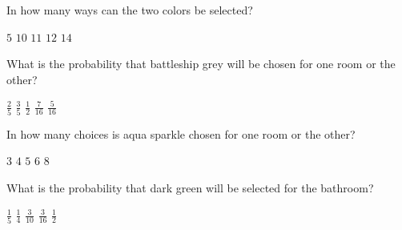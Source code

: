 \documentclass[answers,12pt]{exam}
\begin{document}
\begin{questions}

\question\label{FirstColor}
In how many ways can the two colors be selected?\\
\begin{oneparchoices}
\choice $5$ %
\correctchoice $10$
\choice $11$ %
\choice $12$ %
\choice $14$ %
\end{oneparchoices}

\question
What is the probability that battleship grey will be chosen
for one room or the other?\\
\begin{oneparchoices}
\choice $\frac{2}{5}$ %
\correctchoice $\frac{3}{5}$
\choice $\frac{1}{2}$ %
\choice $\frac{7}{16}$ %
\choice $\frac{5}{16}$ %
\end{oneparchoices}

\question
In how many choices is aqua sparkle chosen for
one room or the other?\\
\begin{oneparchoices}
\choice $3$
\correctchoice $4$
\choice $5$ %
\choice $6$ %
\choice $8$
\end{oneparchoices}

\question\label{LastColor}
What is the probability that dark green will be selected
for the bathroom?\\
\begin{oneparchoices}
\correctchoice $\frac{1}{5}$
\choice $\frac{1}{4}$ %
\choice $\frac{3}{10}$ %
\choice $\frac{3}{16}$ %
\choice $\frac{1}{2}$ %
\end{oneparchoices}
\newpage



\end{questions}
\end{document}
